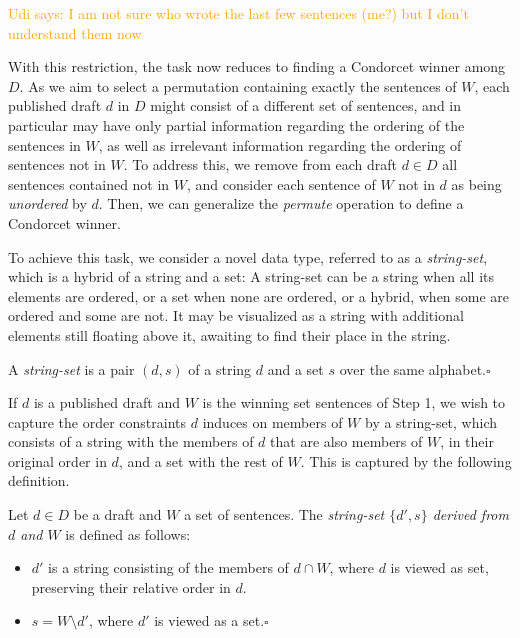 \documentclass[sigconf]{aamas}  %
\newcommand{\udi}[1]{\textcolor{orange}{Udi says: #1}}
\newcommand{\qqed}{\hfill$\square$}
\begin{document}
\udi{I am not sure who wrote the last few sentences (me?) but I don't understand them now}

With this restriction, the task now reduces to finding a Condorcet winner among $D$. As we aim to select a permutation containing exactly the sentences of $W$,
each published draft $d$ in $D$ might consist of a different set of sentences, and in particular may have only partial information regarding the ordering of the sentences in $W$, as well as irrelevant information regarding the ordering of sentences not in $W$.  To address this, we remove from each draft $d \in D$ all sentences contained not in $W$, and consider each sentence of $W$ not in $d$ as being \emph{unordered} by $d$.  Then, we can generalize the \emph{permute} operation to define a Condorcet winner.

To achieve this task, we consider a novel data type, referred to as a \emph{string-set}, which is a hybrid of a string and a set:
  A string-set can be a string when all its elements are ordered,
  or a set when none are ordered,
  or a hybrid, when some are ordered and some are not.
It may be visualized as a string with additional elements still floating above it, awaiting to find their place in the string.

\begin{definition}
  A \emph{string-set} is a pair
  $(d, s)$
  of a string $d$ 
  and a set $s$ over the same alphabet.\qqed
\end{definition}

If $d$ is a published draft and $W$ is the winning set sentences of Step 1, we wish to capture the order constraints $d$ induces on members of $W$ by a string-set, which consists of a string with the members of $d$ that are also members of $W$, in their original order in $d$, and a set with the rest of $W$. This is captured by the following definition.

\begin{definition}
Let $d \in D$ be a draft and $W$ a set of sentences.
The \emph{string-set $\{d',s\}$ derived from $d$ and $W$} is defined as follows:
\begin{itemize}

\item
$d'$ is a string consisting of the members of $d \cap W$, where $d$ is viewed as set, preserving their relative order in $d$.

\item
$s = W \setminus d'$, where $d'$ is viewed as a set.\qqed

\end{itemize}
%
\end{definition}
\end{document}
